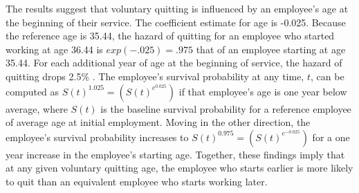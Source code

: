 The results suggest that voluntary quitting is influenced by an employee's age at the beginning of their service. The coefficient estimate for age is -0.025. Because the reference age is 35.44, the hazard of quitting for an employee who started working at age 36.44 is $exp(-.025)=.975$ that of an employee starting at age 35.44. For each additional year of age at the beginning of service, the hazard of quitting drops 2.5\% . The employee's survival probability at any time, $t$, can be computed as $S(t)^{1.025} = (S(t)^{e^{0.025}})$ if that employee's age is one year below average, where $S(t)$ is the baseline survival probability for a reference employee of average age at initial employment. Moving in the other direction, the employee's survival probability increases to $S(t)^{0.975}=(S(t)^{e^{-0.025}})$ for a one year increase in the employee's starting age. Together, these findings imply that at any given voluntary quitting age, the employee who starts earlier is more likely to quit than an equivalent employee who starts working later.

